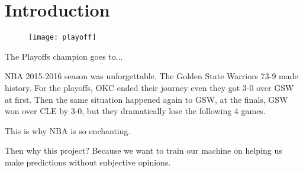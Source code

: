 \section{Introduction}


\begin{figure}[h]
\centering
\texttt{[image: playoff]}
\end{figure}

\par The Playoffs champion goes to...

NBA 2015-2016 season was unforgettable. The Golden State Warriors 73-9 made history.
For the playoffs, OKC ended their journey even they got 3-0 over GSW at first.
Then the same situation happened again to GSW, at the finals, GSW won over CLE
by 3-0, but they dramatically lose the following 4 games.

This is why NBA is so enchanting. 

Then why this project? Because we want to train our machine on helping us make 
predictions without subjective opinions.


